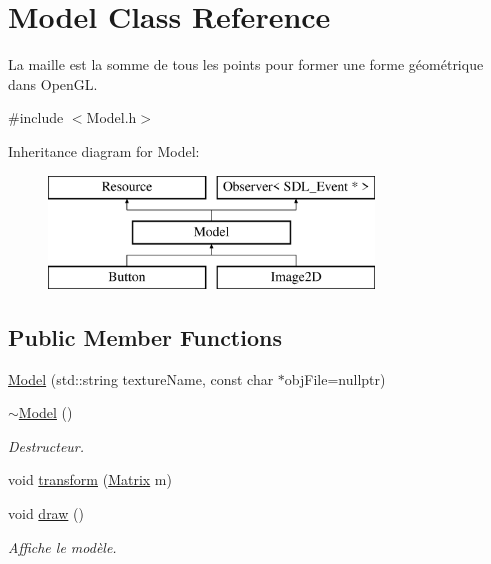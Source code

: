 \hypertarget{class_model}{}\section{Model Class Reference}
\label{class_model}


La maille est la somme de tous les points pour former une forme géométrique dans Open\+G\+L.  




{\ttfamily \#include $<$Model.\+h$>$}

Inheritance diagram for Model\+:\begin{figure}[H]
\begin{center}
\leavevmode
\includegraphics[height=3.000000cm]{class_model}
\end{center}
\end{figure}
\subsection*{Public Member Functions}
\begin{DoxyCompactItemize}
\item 
\hyperlink{class_model_a937b79174d504d60dad6b36219ab5c3d}{Model} (std\+::string texture\+Name, const char $\ast$obj\+File=nullptr)
\item 
\hypertarget{class_model_ad6ebd2062a0b823db841a0b88baac4c0}{}\hyperlink{class_model_ad6ebd2062a0b823db841a0b88baac4c0}{$\sim$\+Model} ()\label{class_model_ad6ebd2062a0b823db841a0b88baac4c0}

\begin{DoxyCompactList}\small\item\em Destructeur. \end{DoxyCompactList}\item 
void \hyperlink{class_model_abb7259ff422782ae7c182d2d40c80cc7}{transform} (\hyperlink{class_matrix}{Matrix} m)
\item 
\hypertarget{class_model_ac7b168fc3a84f9ac2b558d1019869ca7}{}void \hyperlink{class_model_ac7b168fc3a84f9ac2b558d1019869ca7}{draw} ()\label{class_model_ac7b168fc3a84f9ac2b558d1019869ca7}

\begin{DoxyCompactList}\small\item\em Affiche le modèle. \end{DoxyCompactList}\end{DoxyCompactItemize}
